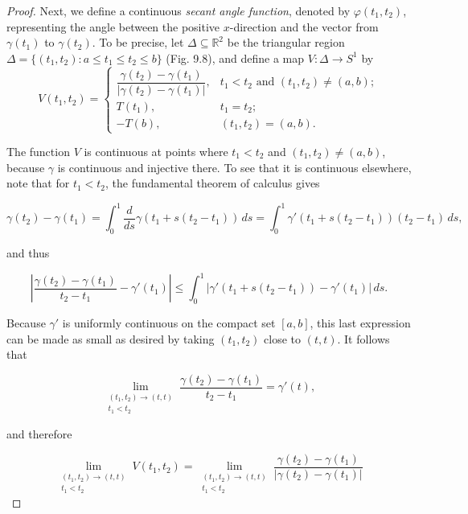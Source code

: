 \begin{proof}
Next, we define a continuous \emph{secant angle function}, denoted by $\varphi(t_1, t_2)$, representing the angle between the positive $x$-direction and the vector from $\gamma(t_1)$ to $\gamma(t_2)$. To be precise, let $\Delta \subseteq \mathbb{R}^2$ be the triangular region $\Delta = \{(t_1, t_2) : a \le t_1 \le t_2 \le b\}$ (Fig. 9.8), and define a map $V: \Delta \to S^1$ by
\[
V(t_1, t_2) = \begin{cases}
\dfrac{\gamma(t_2) - \gamma(t_1)}{|\gamma(t_2) - \gamma(t_1)|}, & t_1 < t_2 \text{ and } (t_1, t_2) \ne (a,b); \\[1mm]
T(t_1), & t_1 = t_2; \\[1mm]
-T(b), & (t_1, t_2) = (a,b).
\end{cases}
\]


The function $V$ is continuous at points where $t_1 < t_2$ and $(t_1, t_2) \ne (a,b)$, because $\gamma$ is continuous and injective there. To see that it is continuous elsewhere, note that for $t_1 < t_2$, the fundamental theorem of calculus gives

\[
\gamma(t_2) - \gamma(t_1) = \int_0^1 \frac{d}{ds} \gamma(t_1 + s(t_2 - t_1)) \, ds = \int_0^1 \gamma'(t_1 + s(t_2 - t_1))(t_2 - t_1) \, ds,
\]

and thus

\[
\left| \frac{\gamma(t_2) - \gamma(t_1)}{t_2 - t_1} - \gamma'(t_1) \right| \le \int_0^1 |\gamma'(t_1 + s(t_2 - t_1)) - \gamma'(t_1)| \, ds.
\]

Because $\gamma'$ is uniformly continuous on the compact set $[a,b]$, this last expression can be made as small as desired by taking $(t_1, t_2)$ close to $(t,t)$. It follows that

\[
\lim_{\substack{(t_1,t_2) \to (t,t) \\ t_1 < t_2}} \frac{\gamma(t_2) - \gamma(t_1)}{t_2 - t_1} = \gamma'(t),
\]

and therefore

\[
\lim_{\substack{(t_1,t_2) \to (t,t) \\ t_1 < t_2}} V(t_1, t_2) = \lim_{\substack{(t_1,t_2) \to (t,t) \\ t_1 < t_2}} \frac{\gamma(t_2) - \gamma(t_1)}{|\gamma(t_2) - \gamma(t_1)|}
\]


\end{proof}
